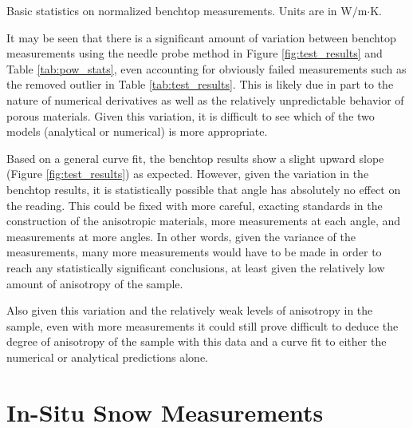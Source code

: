 \begin{table}[h]
\centering

\caption{Basic statistics on normalized benchtop measurements.  Units are in W\(/\)m\(\cdot\)K.}
\label{tab:pow-stats}
\end{table}


It may be seen that there is a significant amount of variation between
benchtop measurements using the needle probe method in Figure \ref{fig:test_results} and Table \ref{tab:pow_stats}, even accounting for obviously failed measurements such as the removed outlier in Table \ref{tab:test_results}.
This is likely due in part to the nature of numerical derivatives as well as the relatively
unpredictable behavior of porous materials. Given
this variation, it is difficult to see which of the two models (analytical or numerical) is more appropriate.

Based on a general curve fit, the benchtop results show a slight upward slope (Figure \ref{fig:test_results}) as
expected. However, given the variation in the benchtop results, it is statistically
possible that angle has absolutely no effect on the reading. This could be fixed
with more careful, exacting standards in the construction of the anisotropic
materials, more measurements at each angle, and measurements at more angles.
In other words, given the variance of the measurements, many more measurements
would have to be made in order to reach any statistically significant
conclusions, at least given the relatively low amount of anisotropy of the sample.

Also given this variation and the relatively weak levels of anisotropy in the
sample, even with more measurements it could still prove difficult to deduce
the degree of anisotropy of the sample with this data and a curve fit to either
the numerical or analytical predictions alone.

\section{In-Situ Snow Measurements}

